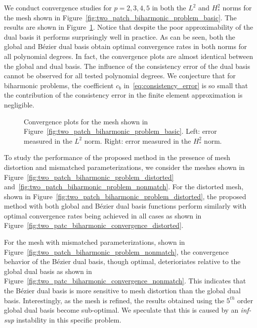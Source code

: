 We conduct convergence studies for $p=2,3,4,5$ in both the $L^2$ and $H^2_*$ norms for the mesh shown in Figure~\ref{fig:two_patch_biharmonic_problem_basic}. The results are shown in Figure~\ref{fig:two_patc_biharmonic_convergence_basic}. Notice that despite the poor approximability of the \Bezier dual basis it performs surprisingly well in practice. As can be seen, both the global and B\'ezier dual basis obtain optimal convergence rates in both norms for all polynomial degrees. In fact, the convergence plots are almost identical between the global and \Bezier dual basis. The influence of the consistency error of the \Bezier dual basis cannot be observed for all tested polynomial degrees. We conjecture that for biharmonic problems, the coefficient $c_b$ in~\eqref{eq:consistency_error} is so small that the contribution of the consistency error in the finite element approximation is negligible.\par

\begin{figure}[ht]
	\centering
	\begin{subfigure}[b]{0.47\textwidth}
		
	\end{subfigure}
	\hfill
	\begin{subfigure}[b]{0.47\textwidth}
		
	\end{subfigure}
	\caption{Convergence plots for the mesh shown in Figure~\ref{fig:two_patch_biharmonic_problem_basic}. Left: error measured in the $L^2$ norm. Right: error measured in the $H^2_*$ norm.}\label{fig:two_patc_biharmonic_convergence_basic}
\end{figure}

To study the performance of the proposed method in the presence of mesh distortion and mismatched parameterizations, we consider the meshes shown in Figure~\ref{fig:two_patch_biharmonic_problem_distorted} and~\ref{fig:two_patch_biharmonic_problem_nonmatch}. For the distorted mesh, shown in Figure~\ref{fig:two_patch_biharmonic_problem_distorted}, the proposed method with both global and B\'ezier dual basis functions perform similarly with optimal convergence rates being achieved in all cases as shown in Figure~\ref{fig:two_patc_biharmonic_convergence_distorted}.

For the mesh with mismatched parameterizations, shown in Figure~\ref{fig:two_patch_biharmonic_problem_nonmatch}, the convergence behavior of the B\'ezier dual basis, though optimal, deterioriates relative to the global dual basis as shown in Figure~\ref{fig:two_patc_biharmonic_convergence_nonmatch}. This indicates that the B\'ezier dual basis is more sensitive to mesh distortion than the global dual basis. Interestingly, as the mesh is refined, the results obtained using the $5^{th}$ order global dual basis become sub-optimal. We speculate that this is caused by an \textit{inf-sup} instability in this specific problem.

